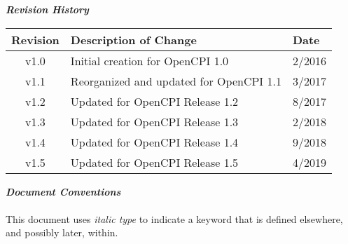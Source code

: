 \maketitle
\thispagestyle{empty}
\newpage
\begin{center}
  \textit{\textbf{Revision History}}
  \begin{table}[H]
    \begin{tabularx}{\textwidth}{|c|X|l|}
      \hline
      \rowcolor{blue}
      \textbf{Revision} & \textbf{Description of Change} & \textbf{Date} \\
      \hline
      v1.0 & Initial creation for OpenCPI 1.0 & 2/2016 \\
      \hline
      v1.1 & Reorganized and updated for OpenCPI 1.1 & 3/2017 \\
      \hline
      v1.2 & Updated for OpenCPI Release 1.2 & 8/2017 \\
      \hline
      v1.3 & Updated for OpenCPI Release 1.3 & 2/2018 \\
      \hline
      v1.4 & Updated for OpenCPI Release 1.4 & 9/2018 \\
      \hline
      v1.5 & Updated for OpenCPI Release 1.5 & 4/2019 \\
      \hline
    \end{tabularx}
  \end{table}
  \par
  \textit{\textbf{Document Conventions}}\\
  ~\\
  This document uses \textit{italic type} to indicate a keyword that is defined elsewhere, and possibly later, within.
\end{center}
\newpage

\tableofcontents
\newpage


